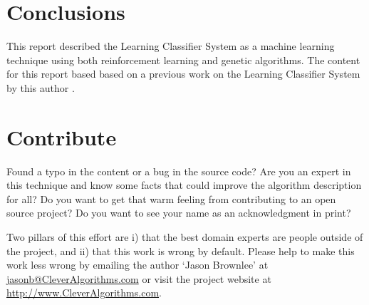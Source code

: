 \documentclass[a4paper, 11pt]{article}
\makeatletter
\newcommand{\myreportauthor}{Jason Brownlee}
\newcommand{\myreportemail}{jasonb@CleverAlgorithms.com}
\newcommand{\myreportwebsite}{http://www.CleverAlgorithms.com}
\makeatother
\begin{document}
% 
% 
\section{Conclusions}
\label{sec:conclusions}
This report described the Learning Classifier System as a machine learning technique using both reinforcement learning and genetic algorithms. The content for this report based based on a previous work on the Learning Classifier System by this author \cite{Brownlee2007a}.

% 
% 
\section{Contribute}
\label{sec:contribute}
Found a typo in the content or a bug in the source code? 
Are you an expert in this technique and know some facts that could improve the algorithm description for all?
Do you want to get that warm feeling from contributing to an open source project? 
Do you want to see your name as an acknowledgment in print?

Two pillars of this effort are i) that the best domain experts are people outside of the project, and ii) that this work is wrong by default. 
Please help to make this work less wrong by emailing the author `\myreportauthor' at \url{\myreportemail} or visit the project website at \url{\myreportwebsite}.



\end{document}
